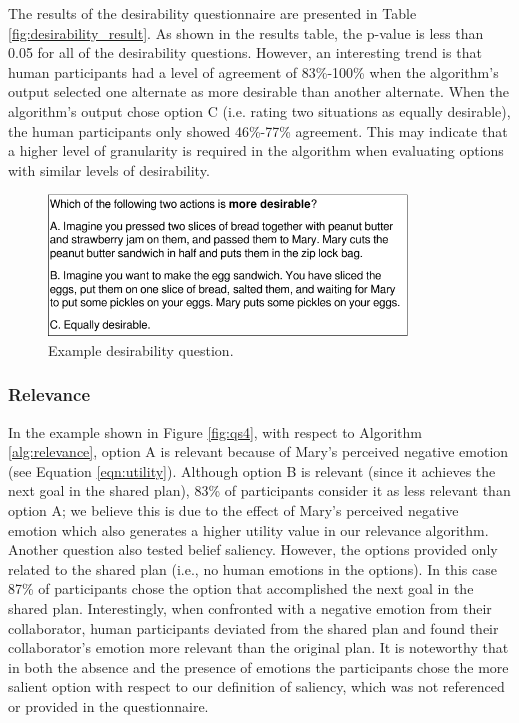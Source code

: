 \documentclass[12pt]{report}
\begin{document}
The results of the desirability questionnaire are presented in Table
\ref{fig:desirability_result}. As shown in the results table, the p-value is
less than 0.05 for all of the desirability questions. However, an interesting
trend is that human participants had a level of agreement of 83\%-100\% when the
algorithm's output selected one alternate as more desirable than another
alternate. When the algorithm's output chose option C (i.e. rating two
situations as equally desirable), the human participants only showed 46\%-77\%
agreement. This may indicate that a higher level of granularity is required in
the algorithm when evaluating options with similar levels of desirability.

\begin{figure}[t]
  \centering
  \includegraphics[width=0.85\textwidth]{figure/question-sample3-croped.pdf}
  \caption{{Example desirability question.}}
  \label{fig:qs3}
\end{figure}

\subsubsection{Relevance}
\label{sec:relevance-crowdsourcing}
In the example shown in Figure \ref{fig:qs4}, with respect to Algorithm
\ref{alg:relevance}, option A is relevant because of Mary's perceived negative
emotion (see Equation \ref{eqn:utility}). Although option B is relevant (since
it achieves the next goal in the shared plan), 83\% of participants consider it as
less relevant than option A; we believe this is due to the effect of Mary's
perceived negative emotion which also generates a higher utility value in our
relevance algorithm. Another question also tested belief saliency. However, the
options provided only related to the shared plan (i.e., no human emotions in the
options). In this case 87\% of participants chose the option that accomplished the
next goal in the shared plan. Interestingly, when confronted with a negative
emotion from their collaborator, human participants deviated from the shared plan
and found their collaborator's emotion more relevant than the original plan. It
is noteworthy that in both the absence and the presence of emotions the
participants chose the more salient option with respect to our definition of
saliency, which was not referenced or provided in the questionnaire.
\end{document}
